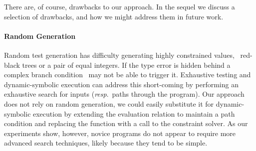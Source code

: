 There are, of course, drawbacks to our approach.
%
In the sequel we discuss a selection of drawbacks, and how we might
address them in future work.

\paragraph{Random Generation}
Random test generation has difficulty generating highly constrained
values, \eg\ red-black trees or a pair of equal integers. If the type
error is hidden behind a complex branch condition \nanomaly\ may not be
able to trigger it. Exhaustive testing and dynamic-symbolic execution
can address this short-coming by performing an exhaustive search for
inputs (\emph{resp}.\ paths through the program). Our approach does not
rely on random generation, we could easily substitute it for
dynamic-symbolic execution by extending the evaluation relation to
maintain a path condition and replacing the \gensym function with a call
to the constraint solver.
%
As our experiments show, however, novice programs do not appear to
require more advanced search techniques, likely because they tend to be
simple.



